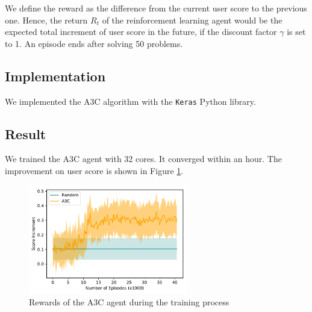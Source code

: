         We define the reward as the difference from the current user score to the previous one.
        Hence, the return $R_t$ of the reinforcement learning agent
        would be the expected total increment of user score in the future,
        if the discount factor $\gamma$ is set to 1.
        An episode ends after solving 50 problems.

    \subsection{Implementation}

        We implemented the A3C algorithm with the \verb|Keras|\cite{chollet2015keras} Python library.

    \subsection{Result}

        We trained the A3C agent with 32 cores.
        It converged within an hour.
        The improvement on user score is shown in Figure \ref{fig:a3c-episode-reward}.
        \begin{figure}[!htp]
            \centering
            \includegraphics[width=0.62\textwidth]{img/a3c-episode-reward.pdf}
            \caption{Rewards of the A3C agent during the training process}
            \label{fig:a3c-episode-reward}
        \end{figure}










